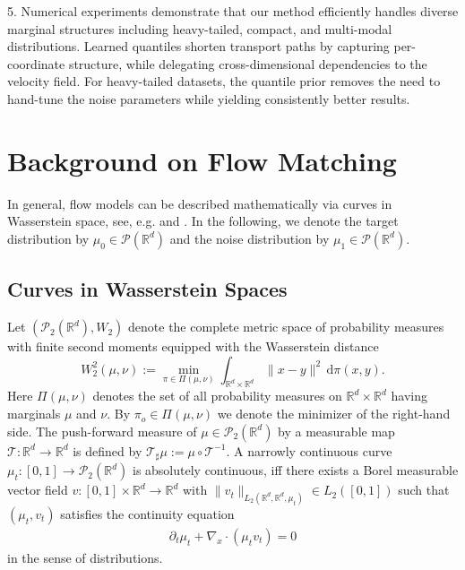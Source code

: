 \documentclass{article}
\newcommand{\R}{\mathbb{R}}
\renewcommand{\d}{\, \mathrm{d}}
\theoremstyle{plain}
\theoremstyle{definition}
\theoremstyle{remark}
\begin{document}
5. Numerical experiments demonstrate that our method efficiently handles diverse marginal structures including heavy-tailed, compact, and multi-modal distributions. Learned quantiles shorten transport paths by capturing per-coordinate structure, while delegating cross-dimensional dependencies to the velocity field. For heavy-tailed datasets, the quantile prior removes the need to hand-tune the noise parameters while yielding consistently better results.

\section{Background on Flow Matching}\label{sec:prelim}
In general, flow models can be described mathematically via curves in Wasserstein space, see, e.g. \cite{BookAmGiSa05} and \cite{LHHS2024,WS2025}. In the following, we denote the target distribution by $\mu_0 \in \mathcal{P}(\R^d)$ and the noise distribution by $\mu_1 \in \mathcal{P}(\R^d)$.


\subsection{Curves in Wasserstein Spaces}
Let $(\mathcal P_2(\R^d),W_2)$ denote the complete metric space of probability measures with finite second moments equipped with the Wasserstein distance  
$$
W_2^2(\mu,\nu) := \min_{\pi \in \Pi(\mu,\nu)} \int_{\R^d \times \R^d} \|x-y\|^2 \d \pi(x,y) \big.
$$
Here $\Pi(\mu,\nu)$ denotes the set of all probability measures 
on $\R^d \times \R^d$ having marginals $\mu$ and $\nu$.
By $\pi_o \in \Pi(\mu,\nu)$ we denote the minimizer of the right-hand side.
The push-forward measure of $\mu \in \mathcal P_2(\R^d)$ by a measurable map $\mathcal T:\R^d \to \R^d$ is defined by
$\mathcal T_\sharp \mu := \mu \circ \mathcal T^{-1}$.
A narrowly continuous curve $\mu_t:[0,1] \to \mathcal P_2(\R^d)$ is absolutely continuous,
iff there exists a Borel measurable vector field $v: [0,1]\times \R^d \to \R^d$ with
$
\|v_t\|_{L_2(\R^d, \R^d, \mu_t)} \in L_2([0,1])
$
such that 
$(\mu_t,v_t)$ satisfies the continuity equation
\begin{align}\label{eq:ce}
\partial_t \mu_t + 
\nabla_x \cdot (\mu_t v_t)=0
\end{align}
in the sense of distributions. 
\end{document}
